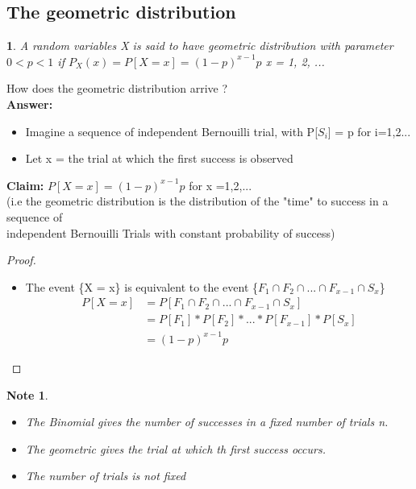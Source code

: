 \documentclass[11pt]{article}
\newtheorem*{note}{Note}
\newtheorem{definition}{\framebox{DEF}}[section]
\newcommand\tab[1][1cm]{\hspace*{#1}}
\begin{document}
        \subsection{\textbf{The geometric distribution}}
            \begin{definition}
                A random variables X is said to have geometric distribution with parameter $0 < p < 1$ if $P_X(x) = P[X = x] = (1-p)^{x-1}p$ x = 1, 2, ...
            \end{definition}
            How does the geometric distribution arrive ? \\
            \textbf{Answer:} 
                \begin{itemize}
                    \item Imagine a sequence of independent Bernouilli trial, with P[$S_i$] = p for i=1,2...
                    \item Let x = the trial at which the first success is observed 
                \end{itemize}
            \textbf{Claim:} $P[X=x] = (1-p)^{x-1}p$ for x =1,2,...\\
            \tab \tab (i.e the geometric distribution is the distribution of the "time" to success in a sequence of\\
            \tab \tab \tab  independent Bernouilli Trials with constant probability of success)
            \begin{proof}\tab 
                \begin{itemize}
                    \item The event \{X = x\} is equivalent to the event \{$F_1 \cap F_2 \cap ... \cap F_{x-1} \cap S_x$\}
                            \begin{align*}
                                P[X=x]  &= P[F_1 \cap F_2 \cap ... \cap F_{x-1} \cap S_x] \\
                                        &= P[F_1]*P[F_2]*...*P[F_{x-1}]*P[S_x] \tag{By the assumption that the trials are indep.}\\
                                        &= (1-p)^{x-1}p \tag{for all x = 1, 2, ...}
                            \end{align*}
                \end{itemize}
            \end{proof} 
            \begin{note}\tab
                \begin{itemize}
                    \item The Binomial gives the number of successes in a fixed number of trials n. 
                    \item The geometric gives the trial at which th first success occurs. 
                    \item The number of trials is not fixed 
                \end{itemize}
            \end{note}
        
\end{document}
